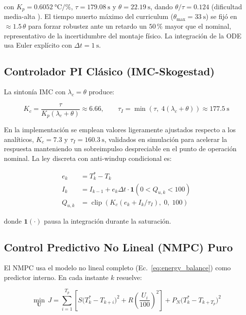 \documentclass[processes,article,submit,moreauthors,pdftex]{Definitions/mdpi}
\newcommand{\Tref}{T^*}
\newcommand{\dt}{\Delta t}
\begin{document}
con $K_p = \SI{0.6052}{\celsius\per\percent}$, $\tau = \SI{179.08}{\second}$
y $\theta = \SI{22.19}{\second}$, dando $\theta/\tau = 0.124$ (dificultad
media-alta \cite{Skogestad2003}). El tiempo muerto máximo del curriculum
($\theta_{\max} = \SI{33}{\second}$) se fijó en $\approx 1.5\,\theta$ para
forzar robustez ante un retardo un $50\,\%$ mayor que el nominal,
representativo de la incertidumbre del montaje físico. La integración de la
ODE usa Euler explícito con $\dt = \SI{1}{\second}$.

\subsection{Controlador PI Clásico (IMC-Skogestad)}
\label{subsec:pi}

La sintonía IMC \cite{Skogestad2003} con $\lambda_c = \theta$ produce:

\begin{equation}
  \label{eq:pi_tuning}
  K_c = \frac{\tau}{K_p(\lambda_c + \theta)} \approx 6.66,
  \qquad
  \tau_I = \min(\tau,\; 4(\lambda_c + \theta)) \approx \SI{177.5}{\second}
\end{equation}

En la implementación se emplean valores ligeramente ajustados respecto a los
analíticos, $K_c = 7.3$ y $\tau_I = \SI{160.3}{\second}$, validados en
simulación para acelerar la respuesta manteniendo un sobreimpulso despreciable
en el punto de operación nominal. La ley discreta con anti-windup condicional es:

\begin{align}
  e_k    &= \Tref_k - T_k \\
  I_k    &= I_{k-1} + e_k \dt \cdot \mathbf{1}(0 < Q_{u,k} < 100) \label{eq:antiwindup}\\
  Q_{u,k}  &= \operatorname{clip}\!\left(K_c\!\left(e_k + I_k / \tau_I\right),\; 0,\; 100\right)
\end{align}

donde $\mathbf{1}(\cdot)$ pausa la integración durante la saturación.

\subsection{Control Predictivo No Lineal (NMPC) Puro}
\label{subsec:nmpc}

El NMPC usa el modelo no lineal completo (Ec.~\eqref{eq:energy_balance})
como predictor interno. En cada instante $k$ resuelve:

\begin{equation}
  \label{eq:nmpc_opt}
  \min_{\mathbf{U}}\, J = \sum_{i=1}^{T_p}\!
    \left[S\bigl(\Tref_k - T_{k+i}\bigr)^2 + R\!\left(\frac{U_i}{100}\right)^2\right]
  + P_N\bigl(\Tref_k - T_{k+T_p}\bigr)^2
\end{equation}
\end{document}
